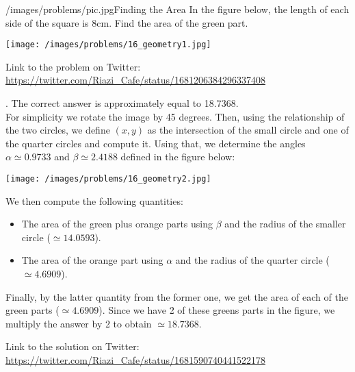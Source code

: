 \begin{problem}{/images/problems/pic.jpg}{Finding the Area}
	In the figure below, the length of each side of the square is 8cm. Find the area of the green part.

\begin{center}
	\texttt{[image: /images/problems/16\_geometry1.jpg]}
\end{center}

Link to the problem on Twitter: \url{https://twitter.com/Riazi_Cafe/status/1681206384296337408}

\end{problem}
\begin{solution}.
The correct answer is approximately equal to 18.7368.\\[0.2cm]

For simplicity we rotate the image by 45 degrees. Then, using the relationship of the two circles, we define $(x,y)$ as the intersection of the small circle and one of the quarter circles and compute it. Using that, we determine the angles $\alpha \simeq 0.9733$ and $\beta \simeq 2.4188$ defined in the figure below:

\begin{center}
	\texttt{[image: /images/problems/16\_geometry2.jpg]}
\end{center}

We then compute the following quantities:
\begin{itemize}
\item The area of the green plus orange parts using $\beta$ and the radius of the smaller circle ($\simeq 14.0593$).
\item The area of the orange part using $\alpha$ and the radius of the quarter circle ($\simeq 4.6909$).
\end{itemize}
Finally, by the latter quantity from the former one, we get the area of each of the green parts ($\simeq 4.6909$). Since we have 2 of these greens parts in the figure, we multiply the answer by 2 to obtain $\simeq 18.7368$.


Link to the solution on Twitter:  \url{https://twitter.com/Riazi_Cafe/status/1681590740441522178}
\end{solution}